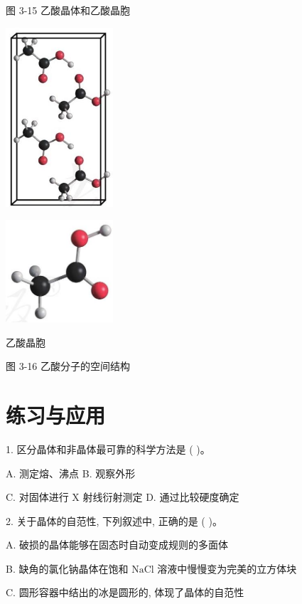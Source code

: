 \documentclass[10pt]{article}
\begin{document}
图 3-15 乙酸晶体和乙酸晶胞

\begin{center}
\includegraphics[max width=0.3\textwidth]{images/0190e026-5a11-7df7-bd27-54d09026ba7a_79_346307.jpg}
\end{center}

\begin{center}
\includegraphics[max width=0.3\textwidth]{images/0190e026-5a11-7df7-bd27-54d09026ba7a_79_225931.jpg}
\end{center}

乙酸晶胞

图 3-16 乙酸分子的空间结构

\section*{练习与应用}

1. 区分晶体和非晶体最可靠的科学方法是 ( )。

A. 测定熔、沸点 B. 观察外形

C. 对固体进行 \(\mathrm{X}\) 射线衍射测定 D. 通过比较硬度确定

2. 关于晶体的自范性, 下列叙述中, 正确的是 ( )。

A. 破损的晶体能够在固态时自动变成规则的多面体

B. 缺角的氯化钠晶体在饱和 \(\mathrm{{NaCl}}\) 溶液中慢慢变为完美的立方体块

C. 圆形容器中结出的冰是圆形的, 体现了晶体的自范性
\end{document}
